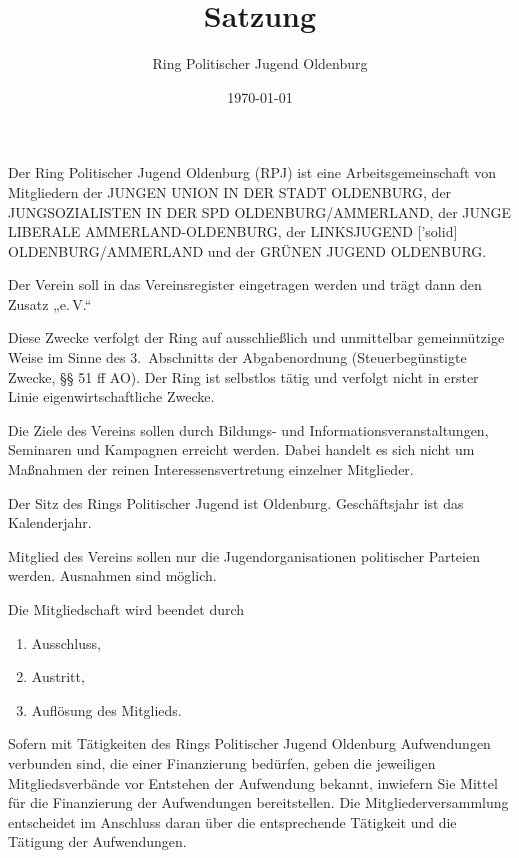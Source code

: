 \documentclass[10pt,a4paper,oneside,parskip=half]{scrartcl}
\title{Satzung}
\date{\today}
\author{Ring Politischer Jugend Oldenburg}
\begin{document}
\maketitle

\begin{contract}

Der Ring Politischer Jugend Oldenburg (RPJ) ist eine Arbeitsgemeinschaft von Mitgliedern der JUNGEN UNION IN DER STADT OLDENBURG, der JUNGSOZIALISTEN IN DER SPD OLDENBURG/AMMERLAND, der JUNGE LIBERALE AMMERLAND-OLDENBURG, der LINKSJUGEND ['solid] OLDENBURG/AMMERLAND und der GRÜNEN JUGEND OLDENBURG.

Der Verein soll in das Vereinsregister eingetragen werden und trägt dann den Zusatz „e.\,V.“

Diese Zwecke verfolgt der Ring auf ausschließlich und unmittelbar gemeinnützige Weise im Sinne des 3.~Abschnitts der Abgabenordnung (Steuerbegünstigte Zwecke, §§ 51 ff AO). Der Ring ist selbstlos tätig und verfolgt nicht in erster Linie eigenwirtschaftliche Zwecke.

Die Ziele des Vereins sollen durch Bildungs- und Informationsveranstaltungen, Seminaren und Kampagnen erreicht werden. Dabei handelt es sich nicht um Maßnahmen der reinen Interessensvertretung einzelner Mitglieder.

Der Sitz des Rings Politischer Jugend ist Oldenburg. Geschäftsjahr ist das Kalenderjahr.

Mitglied des Vereins sollen nur die Jugendorganisationen politischer Parteien werden. Ausnahmen sind möglich.

Die Mitgliedschaft wird beendet durch
\begin{enumerate}
\item Ausschluss,
\item Austritt,
\item Auflösung des Mitglieds.
\end{enumerate}

Sofern mit Tätigkeiten des Rings Politischer Jugend Oldenburg Aufwendungen verbunden sind, die einer Finanzierung bedürfen, geben die jeweiligen Mitgliedsverbände vor Entstehen der Aufwendung bekannt, inwiefern Sie Mittel für die Finanzierung der Aufwendungen bereitstellen. Die Mitgliederversammlung entscheidet im Anschluss daran über die entsprechende Tätigkeit und die Tätigung der Aufwendungen.


\end{contract}
\end{document}
